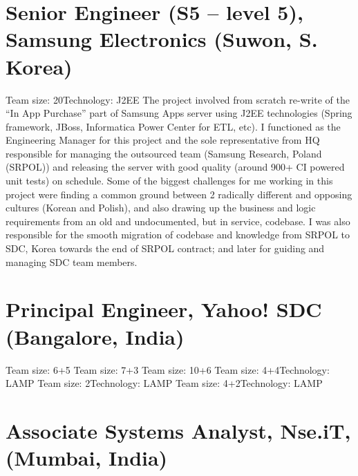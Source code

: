 \documentclass[11pt,a4paper,sans]{moderncv} %
\begin{document}
\section{Senior Engineer (S5 -- level 5), Samsung Electronics (Suwon, S. Korea)}
         {Team size: 20}{Technology: J2EE}
         {The project involved from scratch re-write of the ``In App Purchase'' part of Samsung Apps server using J2EE technologies (Spring framework, JBoss, Informatica Power Center for ETL, etc). I functioned as the Engineering Manager for this project and the sole representative from HQ responsible for managing the outsourced team (Samsung Research, Poland (SRPOL)) and releasing the server with good quality (around 900+ CI powered unit tests) on schedule. Some of the biggest challenges for me working in this project were finding a common ground between 2 radically different and opposing cultures (Korean and Polish), and also drawing up the business and logic requirements from an old and undocumented, but in service, codebase. I was also responsible for the smooth migration of codebase and knowledge from SRPOL to SDC, Korea towards the end of SRPOL contract; and later for guiding and managing SDC team members.}

\section{Principal Engineer, Yahoo! SDC (Bangalore, India)}
         {Team size: 6+5}{}{}
         {Team size: 7+3}{}{}
         {Team size: 10+6}{}{}
         {Team size: 4+4}{Technology: LAMP}{}
         {Team size: 2}{Technology: LAMP}{}
         {Team size: 4+2}{Technology: LAMP}{}

\section{Associate Systems Analyst, Nse.iT, (Mumbai, India)}

\end{document}
